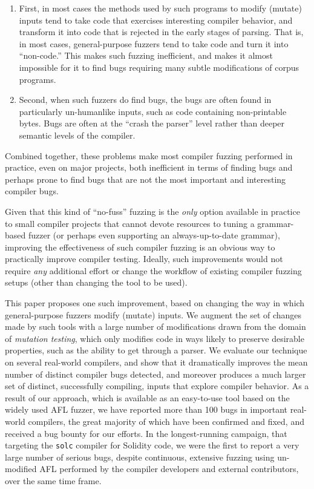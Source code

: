\begin{enumerate}
\item First, in most cases the methods used by such programs to modify
  (mutate) inputs tend to take code that exercises interesting
  compiler behavior, and transform it into code that is rejected in
  the early stages of parsing.  That is, in most cases,
  general-purpose fuzzers tend to take code and turn it into
  ``non-code.''  This makes such fuzzing inefficient, and makes it
  almost impossible for it to find bugs requiring many subtle
  modifications of corpus programs.
  \item Second, when such fuzzers do find bugs, the bugs are often
    found in particularly un-humanlike inputs, such as code
    containing non-printable bytes.  Bugs are often at the ``crash the
    parser'' level rather than deeper semantic levels of the compiler.
  \end{enumerate}

  Combined together, these problems make most compiler fuzzing
  performed in practice, even on major projects, both inefficient in
  terms of finding bugs and perhaps prone to find bugs that are not
  the most important and interesting compiler bugs.

  Given that this kind of ``no-fuss'' fuzzing is the \emph{only} option available in
  practice to small compiler projects that cannot devote resources to
  tuning a grammar-based fuzzer (or perhaps even supporting an
  always-up-to-date grammar), improving the effectiveness of such
  compiler fuzzing is an obvious way to practically improve compiler
  testing.  Ideally, such improvements would not require \emph{any}
  additional effort or change the workflow of existing compiler
  fuzzing setups (other than changing the  tool to be used).

  This paper proposes one such improvement, based on changing the way
  in which general-purpose fuzzers modify (mutate) inputs.  We augment
  the set of changes made by such tools with a large number of
  modifications drawn from the domain of \emph{mutation testing},
  which only modifies code in ways likely to preserve desirable
  properties, such as the ability to get through a parser.  We evaluate
  our technique on several real-world compilers, and show that it
  dramatically improves the mean number of distinct compiler bugs
  detected, and moreover produces a much larger set of distinct,
  successfully compiling, inputs that explore compiler behavior.  As a
  result of our approach, which is available as an easy-to-use tool
  based on the widely used AFL fuzzer, we have reported more than 100
  bugs in important real-world compilers, the great majority of
  which have been confirmed and fixed, and received a bug bounty for
  our efforts.  In the longest-running campaign, that targeting the
  {\tt solc} compiler for Solidity code, we were the first to
  report a very large number of serious bugs, despite continuous, extensive
  fuzzing using un-modified AFL performed by the compiler developers
  and external contributors, over the same time frame.